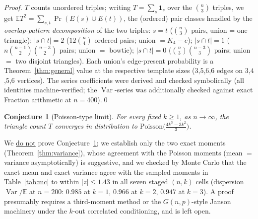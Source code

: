 \documentclass[11pt,a4paper]{article}
\newtheorem{conjecture}[theorem]{Conjecture}
\theoremstyle{definition}
\theoremstyle{definition}
\begin{document}
\begin{proof}
$T$ counts unordered triples; writing $T=\sum_{s}\mathbf 1_s$ over the
$\binom{n}{3}$ triples, we get
$\mathbb ET^{2} = \sum_{s,t}\Pr(E(s)\cup E(t))$, the (ordered) pair classes
handled by the \emph{overlap-pattern decomposition} of the two triples:
$s=t$ ($\binom{n}{3}$ pairs, union = one triangle);
$|s\cap t|=2$ ($12\binom{n}{4}$ ordered pairs; union $=K_4-e$);
$|s\cap t|=1$ ($n\binom{n-1}{2}\binom{n-3}{2}$ pairs; union $=$ bowtie);
$|s\cap t|=0$ ($\binom{n}{3}\binom{n-3}{3}$ pairs; union $=$ two disjoint
triangles). Each union's edge-present probability is a
Theorem~\ref{thm:general} value at the respective template sizes
($3$,$5$,$6$,$6$ edges on $3$,$4$,$5$,$6$ vertices). The series coefficients were
derived and checked symbolically (all identities machine-verified; the
$\operatorname{Var}$-series was additionally checked against exact Fraction
arithmetic at $n=400$).\qed
\end{proof}

\begin{conjecture}[Poisson-type limit]\label{conj:poisson}
For every fixed $k\ge1$, as $n\to\infty$, the triangle count
$T$ converges in distribution to $\text{Poisson}\bigl(\tfrac{4k^3-3k^2}{3}\bigr)$.
\end{conjecture}
We \underline{do not} prove Conjecture~\ref{conj:poisson}; we establish only the two
exact moments (Theorem~\ref{thm:variance}), whose agreement with the Poisson
moments (mean $=$ variance asymptotically) is suggestive, and we checked by Monte
Carlo that the exact mean and exact variance agree with the sampled moments in
Table~\ref{tab:mc} to within $|z|\le 1.43$ in all seven staged $(n,k)$ cells
(dispersion $\operatorname{Var}/\mathbb E$ at $n=200$: $0.985$ at $k=1$, $0.966$
at $k=2$, $0.947$ at $k=3$). A proof presumably requires a third-moment method or
the $G(n,p)$-style Janson machinery under the $k$-out correlated conditioning, and
is left open.
\end{document}
